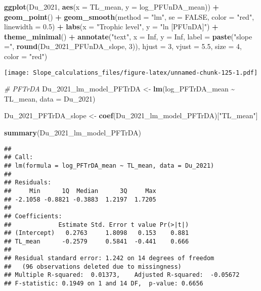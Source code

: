 \documentclass[
]{article}
\newenvironment{Shaded}{\begin{snugshade}}{\end{snugshade}}
\newcommand{\AttributeTok}[1]{\textcolor[rgb]{0.13,0.29,0.53}{#1}}
\newcommand{\CommentTok}[1]{\textcolor[rgb]{0.56,0.35,0.01}{\textit{#1}}}
\newcommand{\ConstantTok}[1]{\textcolor[rgb]{0.56,0.35,0.01}{#1}}
\newcommand{\DecValTok}[1]{\textcolor[rgb]{0.00,0.00,0.81}{#1}}
\newcommand{\FloatTok}[1]{\textcolor[rgb]{0.00,0.00,0.81}{#1}}
\newcommand{\FunctionTok}[1]{\textcolor[rgb]{0.13,0.29,0.53}{\textbf{#1}}}
\newcommand{\NormalTok}[1]{#1}
\newcommand{\OtherTok}[1]{\textcolor[rgb]{0.56,0.35,0.01}{#1}}
\newcommand{\SpecialCharTok}[1]{\textcolor[rgb]{0.81,0.36,0.00}{\textbf{#1}}}
\newcommand{\StringTok}[1]{\textcolor[rgb]{0.31,0.60,0.02}{#1}}
\begin{document}
\begin{Shaded}
\begin{Highlighting}[]
\FunctionTok{ggplot}\NormalTok{(Du\_2021, }\FunctionTok{aes}\NormalTok{(}\AttributeTok{x =}\NormalTok{ TL\_mean, }\AttributeTok{y =}\NormalTok{ log\_PFUnDA\_mean)) }\SpecialCharTok{+}
  \FunctionTok{geom\_point}\NormalTok{() }\SpecialCharTok{+}
  \FunctionTok{geom\_smooth}\NormalTok{(}\AttributeTok{method =} \StringTok{"lm"}\NormalTok{, }\AttributeTok{se =} \ConstantTok{FALSE}\NormalTok{, }\AttributeTok{color =} \StringTok{"red"}\NormalTok{, }\AttributeTok{linewidth =} \FloatTok{0.5}\NormalTok{) }\SpecialCharTok{+}
  \FunctionTok{labs}\NormalTok{(}\AttributeTok{x =} \StringTok{"Trophic level"}\NormalTok{,}
       \AttributeTok{y =} \StringTok{"ln [PFUnDA]"}\NormalTok{) }\SpecialCharTok{+}
  \FunctionTok{theme\_minimal}\NormalTok{() }\SpecialCharTok{+}
  \FunctionTok{annotate}\NormalTok{(}\StringTok{"text"}\NormalTok{, }\AttributeTok{x =} \ConstantTok{Inf}\NormalTok{, }\AttributeTok{y =} \ConstantTok{Inf}\NormalTok{, }\AttributeTok{label =} \FunctionTok{paste}\NormalTok{(}\StringTok{"slope ="}\NormalTok{, }\FunctionTok{round}\NormalTok{(Du\_2021\_PFUnDA\_slope, }\DecValTok{3}\NormalTok{)), }
           \AttributeTok{hjust =} \DecValTok{3}\NormalTok{, }\AttributeTok{vjust =} \FloatTok{5.5}\NormalTok{, }\AttributeTok{size =} \DecValTok{4}\NormalTok{, }\AttributeTok{color =} \StringTok{"red"}\NormalTok{)}
\end{Highlighting}
\end{Shaded}

\texttt{[image: Slope\_calculations\_files/figure-latex/unnamed-chunk-125-1.pdf]}

\begin{Shaded}
\begin{Highlighting}[]
\CommentTok{\# PFTrDA}
\NormalTok{Du\_2021\_lm\_model\_PFTrDA }\OtherTok{\textless{}{-}} \FunctionTok{lm}\NormalTok{(log\_PFTrDA\_mean }\SpecialCharTok{\textasciitilde{}}\NormalTok{ TL\_mean,}
                             \AttributeTok{data =}\NormalTok{ Du\_2021)}

\NormalTok{Du\_2021\_PFTrDA\_slope }\OtherTok{\textless{}{-}} \FunctionTok{coef}\NormalTok{(Du\_2021\_lm\_model\_PFTrDA)[}\StringTok{"TL\_mean"}\NormalTok{]}

\FunctionTok{summary}\NormalTok{(Du\_2021\_lm\_model\_PFTrDA)}
\end{Highlighting}
\end{Shaded}

\begin{verbatim}
## 
## Call:
## lm(formula = log_PFTrDA_mean ~ TL_mean, data = Du_2021)
## 
## Residuals:
##     Min      1Q  Median      3Q     Max 
## -2.1058 -0.8821 -0.3883  1.2197  1.7205 
## 
## Coefficients:
##             Estimate Std. Error t value Pr(>|t|)
## (Intercept)   0.2763     1.8098   0.153    0.881
## TL_mean      -0.2579     0.5841  -0.441    0.666
## 
## Residual standard error: 1.242 on 14 degrees of freedom
##   (96 observations deleted due to missingness)
## Multiple R-squared:  0.01373,    Adjusted R-squared:  -0.05672 
## F-statistic: 0.1949 on 1 and 14 DF,  p-value: 0.6656
\end{verbatim}
\end{document}
